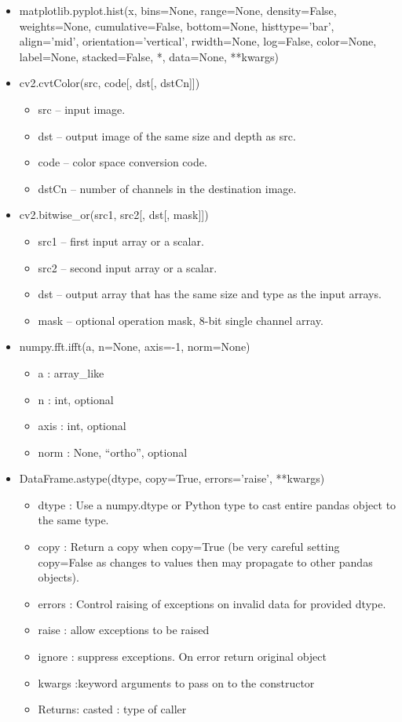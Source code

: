 \documentclass[11pt]{ctexart}
\begin{document}
\begin{itemize}
\begin{itemize}
    \end{itemize}
    \item matplotlib.pyplot.hist(x, bins=None, range=None, density=False, weights=None, cumulative=False, bottom=None, histtype='bar', align='mid', orientation='vertical', rwidth=None, log=False, color=None, label=None, stacked=False, *, data=None, **kwargs)
    \item cv2.cvtColor(src, code[, dst[, dstCn]]) 
    \begin{itemize}
        \item src – input image.
        \item dst – output image of the same size and depth as src.
        \item code – color space conversion code.
        \item dstCn – number of channels in the destination image.
    \end{itemize}
    \item cv2.bitwise\_or(src1, src2[, dst[, mask]])
    \begin{itemize}
        \item src1 – first input array or a scalar.
        \item src2 – second input array or a scalar.
        \item dst – output array that has the same size and type as the input arrays.
        \item mask – optional operation mask, 8-bit single channel array.
    \end{itemize}
    \item numpy.fft.ifft(a, n=None, axis=-1, norm=None)
    \begin{itemize}
        \item a : array\_like
        \item n : int, optional
        \item axis : int, optional
        \item norm : {None, “ortho”}, optional
    \end{itemize}
    \item DataFrame.astype(dtype, copy=True, errors=’raise’, **kwargs)
    \begin{itemize}
        \item dtype : Use a numpy.dtype or Python type to cast entire pandas object to the same type.
        \item copy : Return a copy when copy=True (be very careful setting copy=False as changes to values then may propagate to other pandas objects).
        \item errors : Control raising of exceptions on invalid data for provided dtype.
        \item raise : allow exceptions to be raised
        \item ignore : suppress exceptions. On error return original object
        \item kwargs :keyword arguments to pass on to the constructor
        \item Returns: casted : type of caller
    \end{itemize}
\end{itemize}
\end{document}
